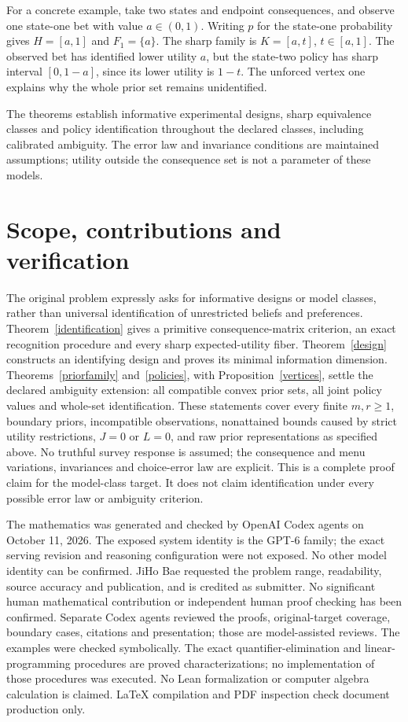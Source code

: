 \documentclass[11pt]{article}
\begin{document}
For a concrete example, take two states and endpoint consequences, and observe one state-one bet with value $a\in(0,1)$. Writing $p$ for the state-one probability gives $H=[a,1]$ and $F_1=\{a\}$. The sharp family is $K=[a,t]$, $t\in[a,1]$. The observed bet has identified lower utility $a$, but the state-two policy has sharp interval $[0,1-a]$, since its lower utility is $1-t$. The unforced vertex one explains why the whole prior set remains unidentified.

The theorems establish informative experimental designs, sharp equivalence classes and policy identification throughout the declared classes, including calibrated ambiguity. The error law and invariance conditions are maintained assumptions; utility outside the consequence set is not a parameter of these models.

\section{Scope, contributions and verification}
The original problem expressly asks for informative designs or model classes, rather than universal identification of unrestricted beliefs and preferences. Theorem~\ref{identification} gives a primitive consequence-matrix criterion, an exact recognition procedure and every sharp expected-utility fiber. Theorem~\ref{design} constructs an identifying design and proves its minimal information dimension. Theorems~\ref{priorfamily} and~\ref{policies}, with Proposition~\ref{vertices}, settle the declared ambiguity extension: all compatible convex prior sets, all joint policy values and whole-set identification. These statements cover every finite $m,r\ge1$, boundary priors, incompatible observations, nonattained bounds caused by strict utility restrictions, $J=0$ or $L=0$, and raw prior representations as specified above. No truthful survey response is assumed; the consequence and menu variations, invariances and choice-error law are explicit. This is a complete proof claim for the model-class target. It does not claim identification under every possible error law or ambiguity criterion.

The mathematics was generated and checked by OpenAI Codex agents on October 11, 2026. The exposed system identity is the GPT-6 family; the exact serving revision and reasoning configuration were not exposed. No other model identity can be confirmed. JiHo Bae requested the problem range, readability, source accuracy and publication, and is credited as submitter. No significant human mathematical contribution or independent human proof checking has been confirmed. Separate Codex agents reviewed the proofs, original-target coverage, boundary cases, citations and presentation; those are model-assisted reviews. The examples were checked symbolically. The exact quantifier-elimination and linear-programming procedures are proved characterizations; no implementation of those procedures was executed. No Lean formalization or computer algebra calculation is claimed. LaTeX compilation and PDF inspection check document production only.
\end{document}
